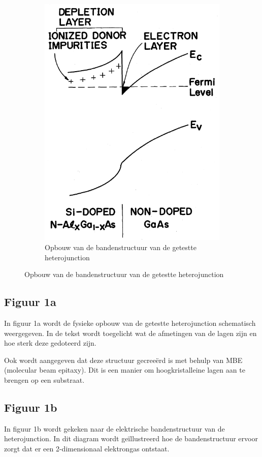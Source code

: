 \documentclass[11pt]{article}
\begin{document}
\begin{figure}[h]
\begin{subfigure}[b]{0.45\textwidth}
    \includegraphics[width=\textwidth]{bandenergy_structure.png}
    \caption{Opbouw van de bandenstructuur van de getestte heterojunction}
    \label{fig:band_structure}
  \end{subfigure}
\end{figure}

\subsection{Figuur 1a}
In figuur 1a wordt de fysieke opbouw van de getestte heterojunction schematisch weergegeven. In de tekst wordt toegelicht wat de afmetingen van de lagen zijn en hoe sterk deze gedoteerd zijn.

Ook wordt aangegeven dat deze structuur gecree\"erd is met behulp van MBE (molecular beam epitaxy). Dit is een manier om hoogkristalleine lagen aan te brengen op een substraat.

\subsection{Figuur 1b}
In figuur 1b wordt gekeken naar de elektrische bandenstructuur van de heterojunction. In dit diagram wordt ge\"illustreerd hoe de bandenstructuur ervoor zorgt dat er een 2-dimensionaal elektrongas ontstaat. 
\end{document}
